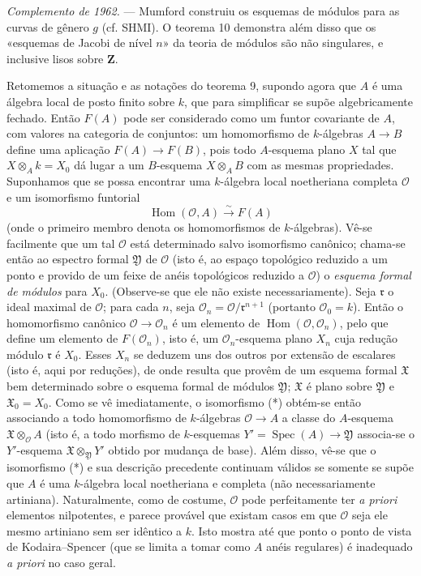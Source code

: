 \emph{Complemento de 1962.} --- Mumford construiu os esquemas de módulos
para as curvas de gênero $g$ (cf. SHMI). O teorema 10 demonstra além disso que
os «esquemas de Jacobi de nível $n$» da teoria de módulos são não singulares,
e inclusive lisos sobre $\mathbf Z$.

Retomemos a situação e as notações do teorema 9, supondo agora que $A$
é uma álgebra local de posto finito sobre $k$, que para simplificar se supõe
algebricamente fechado. Então $F(A)$ pode ser considerado como um funtor
covariante de $A$, com valores na categoria de conjuntos: um homomorfismo de
$k$-álgebras $A\longrightarrow B$ define uma aplicação
$F(A)\longrightarrow F(B)$, pois todo $A$-esquema plano $X$ tal que
$X\otimes_A k=X_0$ dá lugar a um $B$-esquema $X\otimes_A B$ com as mesmas
propriedades. Suponhamos que se possa encontrar uma $k$-álgebra local noetheriana
completa $\mathcal O$ e um isomorfismo funtorial
\begin{equation}
  \tag{*}
  \operatorname{Hom}(\mathcal O,A)\xrightarrow{\sim}F(A)
\end{equation}
(onde o primeiro membro denota os homomorfismos de $k$-álgebras). Vê-se
facilmente que um tal $\mathcal O$ está determinado salvo isomorfismo canônico;
chama-se então ao espectro formal $\mathfrak Y$ de $\mathcal O$ (isto é,
ao espaço topológico reduzido a um ponto e provido de um feixe de anéis
topológicos reduzido a $\mathcal O$) o \emph{esquema formal de módulos} para
$X_0$. (Observe-se que ele não existe necessariamente). Seja $\mathfrak r$ o ideal
maximal de $\mathcal O$; para cada $n$, seja
$\mathcal O_n=\mathcal O/\mathfrak r^{n+1}$ (portanto $\mathcal O_0=k$).
Então o homomorfismo canônico $\mathcal O\longrightarrow\mathcal O_n$ é um
elemento de $\operatorname{Hom}(\mathcal O,\mathcal O_n)$, pelo que define um
elemento de $F(\mathcal O_n)$, isto é, um $\mathcal O_n$-esquema plano $X_n$
cuja redução módulo $\mathfrak r$ é $X_0$. Esses $X_n$ se deduzem uns dos
outros por extensão de escalares (isto é, aqui por reduções), de onde
resulta que provêm de um esquema formal $\mathfrak X$ bem determinado sobre
o esquema formal de módulos $\mathfrak Y$; $\mathfrak X$ é plano sobre
$\mathfrak Y$ e $\mathfrak X_0=X_0$. Como se vê imediatamente, o isomorfismo (*)
obtém-se então associando a todo homomorfismo de $k$-álgebras
$\mathcal O\longrightarrow A$ a classe do $A$-esquema
$\mathfrak X\otimes_{\mathcal O}A$ (isto é, a todo morfismo de $k$-esquemas
$Y'=\operatorname{Spec}(A)\longrightarrow\mathfrak Y$ associa-se o
$Y'$-esquema $\mathfrak X\otimes_{\mathfrak Y}Y'$ obtido por mudança de base).
Além disso, vê-se que o isomorfismo (*) e sua descrição precedente continuam
válidos se somente se supõe que $A$ é uma $k$-álgebra local noetheriana e
completa (não necessariamente artiniana). Naturalmente, como de costume,
$\mathcal O$ pode perfeitamente ter \textit{a priori} elementos nilpotentes,
e parece provável que existam casos em que $\mathcal O$ seja ele mesmo artiniano
sem ser idêntico a $k$. Isto mostra até que ponto o ponto de vista de
Kodaira--Spencer (que se limita a tomar como $A$ anéis regulares) é
inadequado \textit{a priori} no caso geral.

